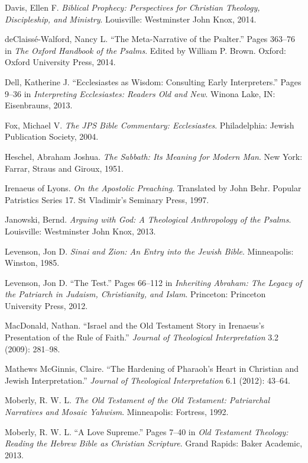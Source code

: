 \documentclass[titlepage]{article}
\begin{document}
\begin{thebibliography}{99}
 Davis, Ellen F. \emph{Biblical Prophecy: Perspectives for Christian Theology, Discipleship, and Ministry}. Louisville: Westminster John Knox, 2014.

 deClaissé-Walford, Nancy L. “The Meta-Narrative of the Psalter.” Pages 363–76 in \emph{The Oxford Handbook of the Psalms}. Edited by William P. Brown. Oxford: Oxford University Press, 2014.

 Dell, Katherine J. “Ecclesiastes as Wisdom: Consulting Early Interpreters.” Pages 9–36 in \emph{Interpreting Ecclesiastes: Readers Old and New}. Winona Lake, IN: Eisenbrauns, 2013.

 Fox, Michael V. \emph{The JPS Bible Commentary: Ecclesiastes}. Philadelphia: Jewish Publication Society, 2004.

 Heschel, Abraham Joshua. \emph{The Sabbath: Its Meaning for Modern Man}. New York: Farrar, Straus and Giroux, 1951.

 Irenaeus of Lyons. \emph{On the Apostolic Preaching}. Translated by John Behr. Popular Patristics Series 17. St Vladimir’s Seminary Press, 1997.

 Janowski, Bernd. \emph{Arguing with God: A Theological Anthropology of the Psalms}. Louisville: Westminster John Knox, 2013.

 Levenson, Jon D. \emph{Sinai and Zion: An Entry into the Jewish Bible}. Minneapolis: Winston, 1985.

 Levenson, Jon D. “The Test.” Pages 66–112 in \emph{Inheriting Abraham: The Legacy of the Patriarch in Judaism, Christianity, and Islam}. Princeton: Princeton University Press, 2012.

 MacDonald, Nathan. “Israel and the Old Testament Story in Irenaeus’s Presentation of the Rule of Faith.” \emph{Journal of Theological Interpretation} 3.2 (2009): 281–98.

 Mathews McGinnis, Claire. “The Hardening of Pharaoh’s Heart in Christian and Jewish Interpretation.” \emph{Journal of Theological Interpretation} 6.1 (2012): 43–64.

 Moberly, R. W. L. \emph{The Old Testament of the Old Testament: Patriarchal Narratives and Mosaic Yahwism}. Minneapolis: Fortress, 1992.

 Moberly, R. W. L. “A Love Supreme.” Pages 7–40 in \emph{Old Testament Theology: Reading the Hebrew Bible as Christian Scripture}. Grand Rapids: Baker Academic, 2013.


\end{thebibliography}
\end{document}
